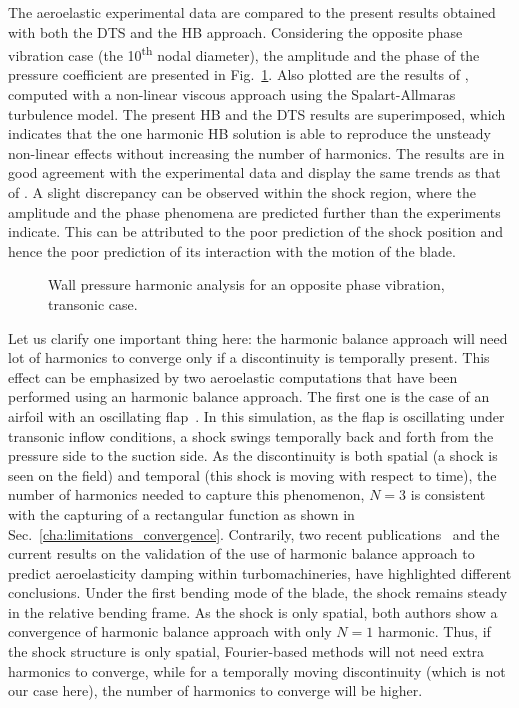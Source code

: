The aeroelastic experimental data are compared to the present results
obtained with both the DTS and the HB approach.  
Considering the opposite phase vibration case (the 10\textsuperscript{th} nodal diameter), 
the amplitude and the
phase of the pressure coefficient are presented in
Fig.~\ref{fig:stcf11_ael_transonic_ibpa_180_paper}. Also plotted are the results of
\citet{Cinnella2004}, computed with a non-linear viscous
approach using the Spalart-Allmaras turbulence model. The present HB and the DTS
results are superimposed, which indicates that the one harmonic HB solution is able
to reproduce the unsteady non-linear effects without increasing the
number of harmonics. The results are in good agreement with
the experimental data and display the same trends as that of
\citet{Cinnella2004}. A slight discrepancy can be observed within the shock
region, where the amplitude and the phase phenomena are predicted
further than the experiments indicate.  This can be attributed to the poor
prediction of the shock position and hence the poor prediction
of its interaction with the motion of the blade.
\begin{figure}[htb]
  \centering
  \caption{Wall pressure harmonic analysis for an opposite phase vibration, transonic case.}
  \label{fig:stcf11_ael_transonic_ibpa_180_paper}
\end{figure}

Let us clarify one important thing here: the harmonic balance approach
will need lot of harmonics to converge only 
if a discontinuity is temporally
present.
This effect can be emphasized by two 
aeroelastic computations that have been performed 
using an harmonic balance approach. 
The first one is the case of 
an airfoil with an oscillating 
flap~\cite{JDufour2009}. In this simulation, as the flap is oscillating
under transonic inflow conditions, a shock swings temporally
back and forth from the pressure side to the
suction side. As the discontinuity is
both spatial (a shock is seen on the field) and temporal
(this shock is moving with respect to time), the number
of harmonics needed to capture this phenomenon, $N=3$ is
consistent with the capturing of a rectangular function
as shown in Sec.~\ref{cha:limitations_convergence}.
Contrarily, two recent publications~\cite{Huang2013a} and the
current results on the validation
of the use of harmonic balance approach to predict
aeroelasticity damping within turbomachineries, have highlighted
different conclusions. Under the first bending mode
of the blade, the shock remains steady in the relative bending frame. As the shock
is only spatial, both authors show a convergence of 
harmonic balance approach with only $N=1$ harmonic. Thus, if the shock
structure is only spatial, Fourier-based methods will not need
extra harmonics to converge, while for a temporally moving discontinuity
(which is not our case here), the number
of harmonics to converge will be higher.

